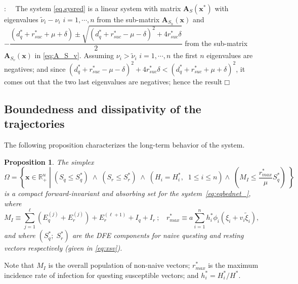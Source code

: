 \documentclass[a4paper]{article}
\newcommand{\edem}{\hfill $\Box$ }
\newcommand{\dsum}{\displaystyle\sum}
\newcommand{\barvarphiVar}{r_{max}}
\newcommand{\varpiVar}{r_{suc}}
\newcommand{\hatmuVar}{d_q}
\newtheorem{prop}{Proposition}[section]
\begin{document}
:~~ The system \eqref{eq.sysred} is a linear system with matrix $\mathbf A_S(\mathbf x^*)$ with eigenvalues $\tilde\nu_i-\nu_i$ $i=1,\cdots,n$ from the sub-matrix $\mathbf A_{S_h}(\mathbf x)$ and $-\dfrac{(\hatmuVar^*+\varpiVar^*+\mu+\delta)\pm\sqrt{(\hatmuVar^*+\varpiVar^*-\mu-\delta)^2+4\varpiVar^*\delta}}{2}$ from the sub-matrix $\mathbf A_{S_v}(\mathbf x)$ in \eqref{eq:A_S_v}. Assuming $\nu_i> \tilde\nu_i$ $i=1,\cdots,n$ the first $n$ eigenvalues are negatives;  and since $(\hatmuVar^*+\varpiVar^*-\mu-\delta)^2+4\varpiVar^*\delta < (\hatmuVar^*+\varpiVar^*+\mu+\delta)^2$, it comes out that the two last eigenvalues are negatives; hence the result\edem

\subsection{Boundedness and dissipativity of the trajectories}
The following proposition characterizes the long-term behavior of the system.
\begin{prop}
 \label{prop:dissip}  The simplex
\begin{equation}\Omega =\left\{\mathbf x\in\mathbb R^u_+\;\left|\;\left(S_q\leqslant S_q^* \right)\;\wedge \;\left(S_r\leqslant S_r^*\right)\;\wedge\;\left(H_i= H^*_i,\;\; 1\leqslant i\leqslant
n \right) \wedge\; \left( M_I\leqslant\frac{\barvarphiVar^* }{\mu}S_q^* \right) \; \right.
\right\}\label{eq.simplex}\end{equation} 
is a compact forward-invariant and absorbing set for the
system~\eqref{eq:eqbednet_},  where
\[
 M_I\equiv {\dsum_{j=1}^\ell} \left(E_q^{(j)} + E_r^{(j)}\right) + E_r^{(\ell+1)} + I_q + I_r~;~~~~\barvarphiVar^* \equiv a{\dsum_{i=1}^n}h_i^*\phi_i(\xi_i+v_i\widetilde\xi_i),
\]
and where $(S_q^*;\; S_r^*)$ are the DFE components for naive questing and resting vectors respectively (given in \eqref{eq:xsv}).
\end{prop}

Note that  $M_I$ is the overall population of non-naive vectors;  $\barvarphiVar^* $  is the maximum incidence rate of infection for questing susceptible vectors; and $h_i^* = H_i^*/H^*$. 
  
\end{document}
